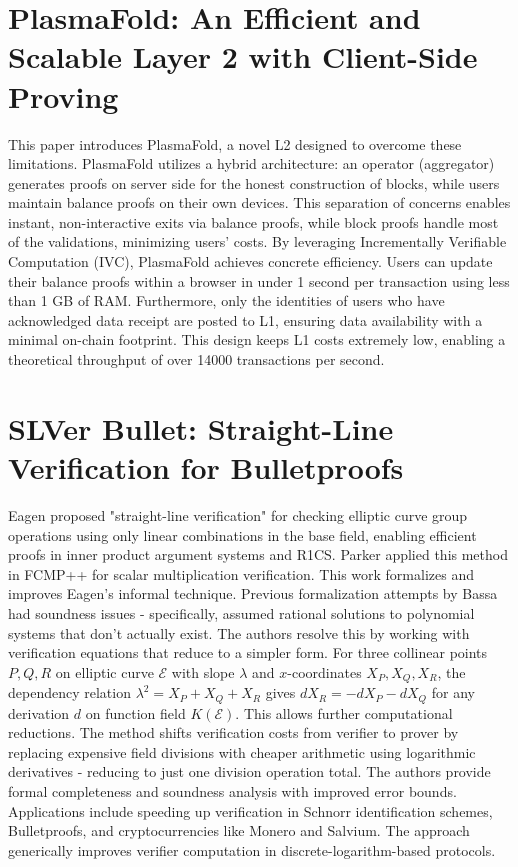 \documentclass[11pt,oneside]{book}
\theoremstyle{definition}
\theoremstyle{remark}
\theoremstyle{plain}
\begin{document}
\section{\cite{PlasmaFold} PlasmaFold: An Efficient and Scalable Layer 2 with Client-Side Proving}
This paper introduces PlasmaFold, a novel L2 designed to overcome these limitations. PlasmaFold utilizes a hybrid architecture: an operator (aggregator) generates proofs on server side for the honest construction of blocks, while users maintain balance proofs on their own devices. This separation of concerns enables instant, non-interactive exits via balance proofs, while block proofs handle most of the validations, minimizing users’ costs. By leveraging Incrementally Verifiable Computation (IVC), PlasmaFold achieves concrete efficiency. Users can update their balance proofs within a browser in under 1 second per transaction using less than 1 GB of RAM. Furthermore, only the identities of users who have acknowledged data receipt are posted to L1, ensuring data availability with a minimal on-chain footprint. This design keeps L1 costs extremely low, enabling a theoretical throughput of over 14000 transactions per second.

\section{\cite{SLVerBullet} SLVer Bullet: Straight-Line Verification for Bulletproofs}
Eagen proposed "straight-line verification" for checking elliptic curve group operations using only linear combinations in the base field, enabling efficient proofs in inner product argument systems and R1CS. Parker applied this method in FCMP++ for scalar multiplication verification. This work formalizes and improves Eagen's informal technique. Previous formalization attempts by Bassa had soundness issues - specifically, assumed rational solutions to polynomial systems that don't actually exist. The authors resolve this by working with verification equations that reduce to a simpler form. For three collinear points $P, Q, R$ on elliptic curve $\mathcal{E}$ with slope $\lambda$ and $x$-coordinates $X_P, X_Q, X_R$, the dependency relation $\lambda^2 = X_P + X_Q + X_R$ gives $dX_R = -dX_P - dX_Q$ for any derivation $d$ on function field $K(\mathcal{E})$. This allows further computational reductions.
The method shifts verification costs from verifier to prover by replacing expensive field divisions with cheaper arithmetic using logarithmic derivatives - reducing to just one division operation total. The authors provide formal completeness and soundness analysis with improved error bounds.
Applications include speeding up verification in Schnorr identification schemes, Bulletproofs, and cryptocurrencies like Monero and Salvium. The approach generically improves verifier computation in discrete-logarithm-based protocols.
\end{document}
